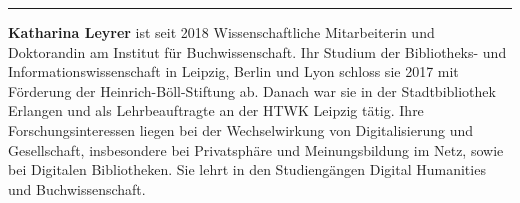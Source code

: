 \begin{center}\rule{0.5\linewidth}{\linethickness}\end{center}

\textbf{Katharina Leyrer} ist seit 2018 Wissenschaftliche Mitarbeiterin
und Doktorandin am Institut für Buchwissenschaft. Ihr Studium der
Bibliotheks- und Informationswissenschaft in Leipzig, Berlin und Lyon
schloss sie 2017 mit Förderung der Heinrich-Böll-Stiftung ab. Danach war
sie in der Stadtbibliothek Erlangen und als Lehrbeauftragte an der HTWK
Leipzig tätig. Ihre Forschungsinteressen liegen bei der Wechselwirkung
von Digitalisierung und Gesellschaft, insbesondere bei Privatsphäre und
Meinungsbildung im Netz, sowie bei Digitalen Bibliotheken. Sie lehrt in
den Studiengängen Digital Humanities und Buchwissenschaft.
